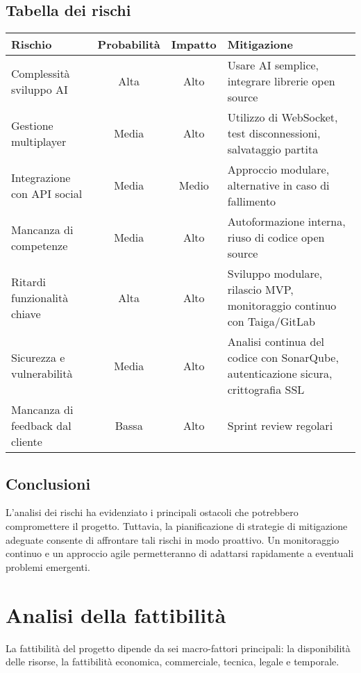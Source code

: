 \documentclass[12pt,a4paper]{report}
\begin{document}
\section{Tabella dei rischi}

\renewcommand{\arraystretch}{2}

\begin{tabular}{p{5cm} c c p{6cm}}
\textbf{Rischio} & \textbf{Probabilità} & \textbf{Impatto} & \textbf{Mitigazione} \\
\hline
Complessità sviluppo AI & Alta & Alto & Usare AI semplice, integrare librerie open source \\
\hline
Gestione multiplayer & Media & Alto & Utilizzo di WebSocket, test disconnessioni, salvataggio partita \\
\hline
Integrazione con API social & Media & Medio & Approccio modulare, alternative in caso di fallimento \\
\hline
Mancanza di competenze & Media & Alto & Autoformazione interna, riuso di codice open source \\
\hline
Ritardi funzionalità chiave & Alta & Alto & Sviluppo modulare, rilascio MVP, monitoraggio continuo con Taiga/GitLab \\
\hline
Sicurezza e vulnerabilità & Media & Alto & Analisi continua del codice con SonarQube, autenticazione sicura, crittografia SSL \\
\hline
Mancanza di feedback dal cliente & Bassa & Alto & Sprint review regolari \\
\hline
\end{tabular}


\section{Conclusioni}
L'analisi dei rischi ha evidenziato i principali ostacoli che potrebbero compromettere il progetto. Tuttavia, la pianificazione di strategie di mitigazione adeguate consente di affrontare tali rischi in modo proattivo. Un monitoraggio continuo e un approccio agile permetteranno di adattarsi rapidamente a eventuali problemi emergenti.

\clearpage

\chapter*{Analisi della fattibilità}
\setcounter{section}{0}

La fattibilità del progetto dipende da sei macro-fattori principali: la disponibilità delle risorse, la fattibilità economica, commerciale, tecnica, legale e temporale.
\end{document}

